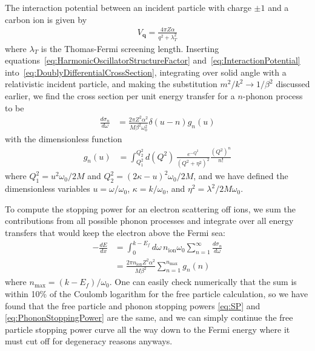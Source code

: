 \documentclass[twocolumn,preprintnumbers,amsmath,amssymb,prl, superscriptaddress]{revtex4}
\begin{document}
\begin{appendices}
The interaction potential between an incident particle with charge $\pm 1$ and a carbon ion is given by
\begin{align}
V_\textbf{q} = \frac{4 \pi Z\alpha}{q^2 + \lambda_T^2}
\label{eq:InteractionPotential}
\end{align}
where $\lambda_T$ is the Thomas-Fermi screening length. Inserting equations~\eqref{eq:HarmonicOscillatorStructureFactor} and~\eqref{eq:InteractionPotential} into~\eqref{eq:DoublyDifferentialCrossSection}, integrating over solid angle with a relativistic incident particle, and making the substitution $m^2 / k^2\to 1/\beta^2$ discussed earlier, we find the cross section per unit energy transfer for a $n$-phonon process to be
\begin{align}
\frac{d \sigma_n}{d \omega}&= \frac{2 \pi Z^2 \alpha^2}{M\beta^2 \omega_0^2} \delta(u - n) g_n(u)
\end{align}
with the dimensionless function
\begin{align}
  g_n(u) &= \int_{Q_1^2}^{Q_2^2} d(Q^2)\, \frac{e^{-Q^2}}{(Q^2 + \eta^2)^2} \frac{(Q^2)^n}{n!}
\end{align}
where $Q_1^2 = u^2 \omega_0 / 2 M$ and $Q_2^2 = (2 \kappa - u)^2 \omega_0 / 2 M$, and we have defined the dimensionless variables $u = \omega / \omega_0$, $\kappa = k / \omega_0$, and $\eta^2 = \lambda^2 / 2 M \omega_0$.

To compute the stopping power for an electron scattering off ions, we sum the contributions from all possible phonon processes and integrate over all energy transfers that would keep the electron above the Fermi sea:
\begin{align}
-\frac{dE}{dx} &= \int_0^{k - E_f} d\omega\, n_\text{ion}\omega_0\sum_{n = 1}^{\infty} \frac{d \sigma_n}{d \omega} \nonumber\\
 &= \frac{2 \pi n_\text{ion} Z^2 \alpha^2}{M \beta^2} \sum_{n = 1}^{n_\text{max}} g_n(n)
 \label{eq:PhononStoppingPower}
\end{align}
where $n_\text{max} = (k - E_f) / \omega_0$. One can easily check numerically that the sum is within 10\% of the Coulomb logarithm for the free particle calculation, so we have found that the free particle and phonon stopping powers \eqref{eq:SP} and \eqref{eq:PhononStoppingPower} are the same, and we can simply continue the free particle stopping power curve all the way down to the Fermi energy where it must cut off for degeneracy reasons anyways.


\end{appendices}
\end{document}
